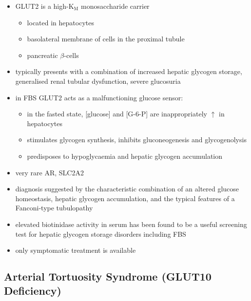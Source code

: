 \documentclass{scrartcl}
\begin{document}
\begin{itemize}
\item GLUT2 is a high-K\(_{\text{M}}\) monosaccharide carrier 
\begin{itemize}
\item located in hepatocytes
\item basolateral membrane of cells in the proximal tubule
\item pancreatic \(\beta\)-cells
\end{itemize}

\item typically presents with a combination of increased hepatic
glycogen storage, generalised renal tubular dysfunction, severe glucosuria

\item in FBS GLUT2 acts as a malfunctioning glucose sensor:
\begin{itemize}
\item in the fasted state, [glucose] and [G-6-P] are inappropriately \(\uparrow\) in hepatocytes
\item stimulates glycogen synthesis, inhibits gluconeogenesis and glycogenolysis
\item predisposes to hypoglycaemia and hepatic glycogen accumulation
\end{itemize}

\item very rare AR, SLC2A2

\item diagnosis suggested by the characteristic combination of an altered
glucose homeostasis, hepatic glycogen accumulation, and the typical
features of a Fanconi-type tubulopathy

\item elevated biotinidase activity in serum has been found to be a useful
screening test for hepatic glycogen storage disorders including FBS

\item only symptomatic treatment is available
\end{itemize}

\subsection{Arterial Tortuosity Syndrome (GLUT10 Deficiency)}
\label{sec:orgc1d8c41}
\end{document}
